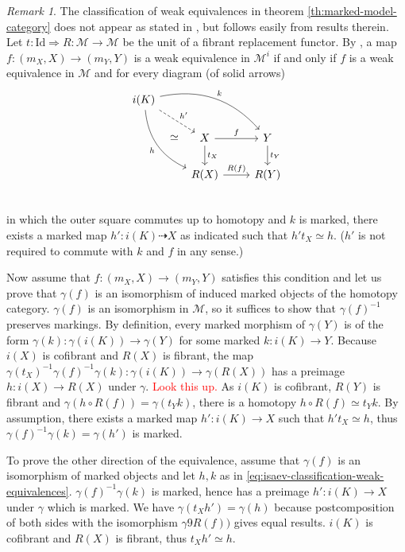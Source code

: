 \documentclass[a4paper]{article}
\newcommand{\todo}[1]{\textcolor{red}{#1}}
\theoremstyle{remark}
\newtheorem{remark}[theorem]{Remark}
\theoremstyle{definition}
\begin{document}
\begin{remark}
  The classification of weak equivalences in theorem \ref{th:marked-model-category} does not appear as stated in \cite{marked-objects}, but follows easily from results therein.
  Let $t : \mathrm{Id} \Rightarrow R : \mathcal{M} \rightarrow \mathcal{M}$ be the unit of a fibrant replacement functor.
  By \cite[lemma 2.5]{marked-objects}, a map $f : (m_X, X) \rightarrow (m_Y, Y)$ is a weak equivalence in $\mathcal{M}^i$ if and only if $f$ is a weak equivalence in $\mathcal{M}$ and for every diagram (of solid arrows)
  \begin{equation}
    \label{eq:isaev-classification-weak-equivalences}
    \begin{tikzcd}
      i(K) \arrow[drr, bend left, "k"] \arrow[ddr, bend right, "h"'] \arrow[dr, dashed, "h'"] \arrow[ddr, phantom, "\simeq"] \\
      & X \arrow[d, "t_X"] \arrow[r, "f"] & Y \arrow[d, "t_Y"]  \\
      & R(X) \arrow[r, "R(f)"] & R(Y)  \\
    \end{tikzcd}
  \end{equation}
  in which the outer square commutes up to homotopy and $k$ is marked, there exists a marked map $h' : i(K) \dashrightarrow X$ as indicated such that $h' t_X \simeq h$.
  ($h'$ is not required to commute with $k$ and $f$ in any sense.)

  Now assume that $f : (m_X, X) \rightarrow (m_Y, Y)$ satisfies this condition and let us prove that $\gamma(f)$ is an isomorphism of induced marked objects of the homotopy category.
  $\gamma(f)$ is an isomorphism in $\mathcal{M}$, so it suffices to show that $\gamma(f)^{-1}$ preserves markings.
  By definition, every marked morphism of $\gamma(Y)$ is of the form $\gamma(k) : \gamma(i(K)) \rightarrow \gamma(Y)$ for some marked $k : i(K) \rightarrow Y$.
  Because $i(X)$ is cofibrant and $R(X)$ is fibrant, the map $\gamma(t_X)^{-1} \gamma(f)^{-1} \gamma(k) : \gamma(i(K)) \rightarrow \gamma(R(X))$ has a preimage $h : i(X) \rightarrow R(X)$ under $\gamma$.
  \todo{Look this up.}
  As $i(K)$ is cofibrant, $R(Y)$ is fibrant and $\gamma(h \circ R(f)) = \gamma(t_Y k)$, there is a homotopy $h \circ R(f) \simeq t_Y k$.
  By assumption, there exists a marked map $h' : i(K) \rightarrow X$ such that $h' t_X \simeq h$, thus $\gamma(f)^{-1} \gamma(k) = \gamma(h')$ is marked.

  To prove the other direction of the equivalence, assume that $\gamma(f)$ is an isomorphism of marked objects and let $h, k$ as in \eqref{eq:isaev-classification-weak-equivalences}.
  $\gamma(f)^{-1} \gamma(k)$ is marked, hence has a preimage $h' : i(K) \rightarrow X$ under $\gamma$ which is marked.
  We have $\gamma(t_X h') = \gamma(h)$ because postcomposition of both sides with the isomorphism $\gamma9R(f))$ gives equal results.
  $i(K)$ is cofibrant and $R(X)$ is fibrant, thus $t_X h' \simeq h$.
\end{remark}
\end{document}
